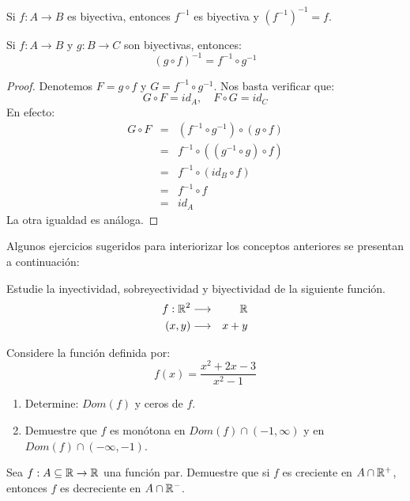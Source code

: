 \begin{corolario}
	Si $f: A \rightarrow B$ es biyectiva, entonces $f^{-1}$ es biyectiva y $(f^{-1})^{-1} = f$. 
\end{corolario}

\begin{proposicion}
	Si $f: A \rightarrow B$ y $g: B \rightarrow C$ son biyectivas, entonces: 
	$$ (g\circ f)^{-1} = f^{-1} \circ g^{-1} $$ 
\end{proposicion}

\begin{proof}
	Denotemos $F = g\circ f $ y $G = f^{-1}\circ g^{-1}$. Nos basta verificar que: 
	$$ G \circ F = id_A , \quad F \circ G = id_C $$ 
	En efecto: 
	\begin{eqnarray*}
		G \circ F  &=& (f^{-1} \circ g^{-1} ) \circ (g \circ f) \\ 
		&=& f^{-1} \circ ((g^{-1} \circ g) \circ f) \\ 
		&=& f^{-1} \circ (id_B \circ f) \\ 
		&=& f^{-1} \circ f \\ 
		&=& id_A
	\end{eqnarray*}  
	La otra igualdad es análoga. 
\end{proof}

Algunos ejercicios sugeridos para interiorizar los conceptos anteriores se presentan a continuación: 

\begin{ejercicio}
	Estudie la inyectividad, sobreyectividad y biyectividad de la siguiente función. 
	\begin{eqnarray*}
		f: \mathbb{R}^2 &\longrightarrow &\mathbb{R} \\
		(x, y)  &\longrightarrow & x + y
	\end{eqnarray*}
\end{ejercicio}

\begin{ejercicio}
	Considere la función definida por: 
	$$ f(x) = \dfrac{x^2 + 2x - 3}{x^2-1} $$ 
	\begin{enumerate}
		\item Determine: $Dom(f)$ y ceros de $f$. 
		\item Demuestre que $f$ es monótona en $Dom(f) \cap (-1, \infty)$ y en $Dom(f) \cap (-\infty, -1)$.
	\end{enumerate}
\end{ejercicio}


\begin{ejercicio}
	Sea $f: A \subseteq \mathbb{R} \rightarrow \mathbb{R}$ una función par. Demuestre que si $f$ es creciente en $A \cap \mathbb{R}^+$, entonces $f$ es decreciente en $A\cap \mathbb{R}^-$. 
\end{ejercicio}

